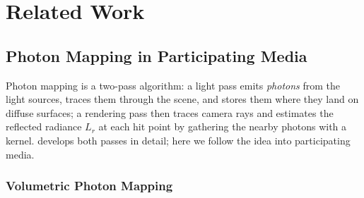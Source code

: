\chapter{Related Work}
\label{chap:related_work}



\section{Photon Mapping in Participating Media}

Photon mapping \cite{jensen96} is a two-pass algorithm: a light pass emits \emph{photons} from the light sources, traces them through the scene, and stores them where they land on diffuse surfaces; a rendering pass then traces camera rays and estimates the reflected radiance $L_r$ at each hit point by gathering the nearby photons with a kernel.  develops both passes in detail; here we follow the idea into participating media.

\subsection{Volumetric Photon Mapping}

